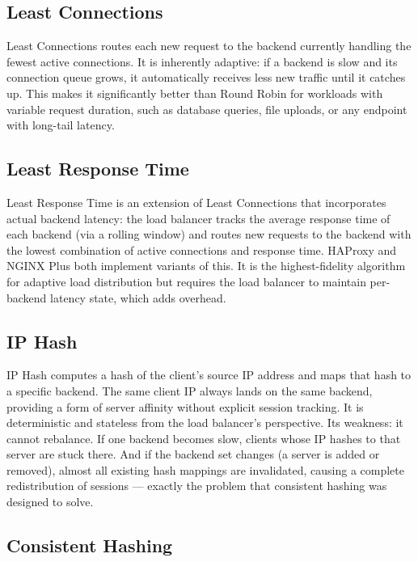 \documentclass[11pt,a4paper]{article}
\begin{document}
\subsection{Least Connections}

Least Connections routes each new request to the backend currently handling the fewest active
connections. It is inherently adaptive: if a backend is slow and its connection queue grows, it
automatically receives less new traffic until it catches up. This makes it significantly better
than Round Robin for workloads with variable request duration, such as database queries, file
uploads, or any endpoint with long-tail latency.

\subsection{Least Response Time}

Least Response Time is an extension of Least Connections that incorporates actual backend latency:
the load balancer tracks the average response time of each backend (via a rolling window) and routes
new requests to the backend with the lowest combination of active connections and response time.
HAProxy and NGINX Plus both implement variants of this. It is the highest-fidelity algorithm for
adaptive load distribution but requires the load balancer to maintain per-backend latency state,
which adds overhead.

\subsection{IP Hash}

IP Hash computes a hash of the client's source IP address and maps that hash to a specific backend.
The same client IP always lands on the same backend, providing a form of server affinity without
explicit session tracking. It is deterministic and stateless from the load balancer's perspective.
Its weakness: it cannot rebalance. If one backend becomes slow, clients whose IP hashes to that
server are stuck there. And if the backend set changes (a server is added or removed), almost all
existing hash mappings are invalidated, causing a complete redistribution of sessions --- exactly
the problem that consistent hashing was designed to solve.

\subsection{Consistent Hashing}
\end{document}
